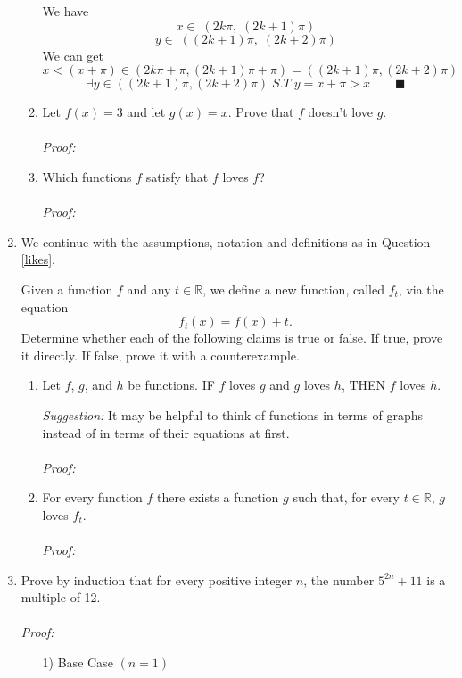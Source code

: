 \documentclass[12pt]{exam}
\newcommand {\DS} [1] {${\displaystyle #1}$}
\newcommand{\vv}{\vspace{.2cm}}
\newcommand{\R}{\mathbb{R}}
\begin{document}
\begin{enumerate}
\begin{enumerate}
		We have 
		$$
			x \in \; (2k\pi, \; (2k + 1)\pi)
		$$
		$$
			y \in \; ((2k + 1)\pi, \; (2k + 2)\pi)
		$$
		We can get
		$$
		x < (x + \pi) \in (2k\pi + \pi, (2k + 1)\pi + \pi) = ((2k + 1)\pi, (2k + 2)\pi)
		$$
		$$
		\exists y \in ((2k + 1)\pi, (2k + 2) \pi) \; S.T \; y=x + \pi > x \quad \quad \blacksquare
		$$

		\newpage
		\item  Let \DS{f(x) = 3} and let \DS{g(x) = x}.  Prove that $f$ doesn't love $g$.
		\\
		\\
		\emph{Proof:}
		\vv
		\newpage
		
		\item  Which functions $f$ satisfy that $f$ loves $f$? 
		\\
		\\
		\emph{Proof:}
		\newpage
		\
	\end{enumerate}
\vv

\item We continue with the assumptions, notation and definitions as in Question \ref{likes}.
	
	Given a function $f$ and any $t \in \R$, we define a new function, called $f_t$, via the equation
	$$
		f_t(x) = f(x) + t.
	$$
	Determine whether each of the following claims is true or false.  If true, prove it directly.  If false, prove it with a counterexample.
	\begin{enumerate}
		\item  Let $f$, $g$, and $h$ be functions. 
				IF $f$ loves $g$ and $g$ loves $h$,
				THEN $f$ loves $h$.
			
			\vv
			\emph{Suggestion:}  It may be helpful to think of functions in terms of graphs instead of in terms of their equations at first.
			\vv
		\\
		\\
		\emph{Proof:}
		
		\newpage	
		\item 
				For every function $f$ there exists a function $g$ such that, for every $t \in \R$, $g$ loves $f_t$.
		\\
		\\
		\emph{Proof:}
		
	\end{enumerate}

\vv

\newpage
\item Prove by induction that for every positive integer $n$, the number \DS{5^{2n}+11} is a multiple of 12.
\\
\\
\emph{Proof:}
	\begin{enumerate}
        \item[1)]Base Case $(n=1)$


\end{enumerate}
\end{enumerate}
\end{document}
